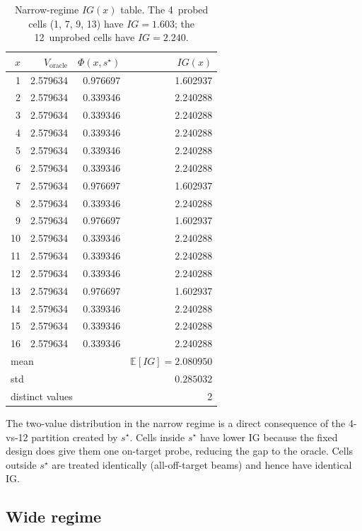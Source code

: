 \documentclass[11pt,a4paper]{article}
\newcommand{\E}{\mathbb{E}}
\begin{document}
\begin{table}[h!]
\centering
\begin{tabular}{@{}rrrr@{}}
\toprule
$x$ & $V_{\text{oracle}}$ & $\Phi(x, s^\star)$ & $IG(x)$ \\
\midrule
1     & 2.579634 & 0.976697 & 1.602937 \\
2     & 2.579634 & 0.339346 & 2.240288 \\
3     & 2.579634 & 0.339346 & 2.240288 \\
4     & 2.579634 & 0.339346 & 2.240288 \\
5     & 2.579634 & 0.339346 & 2.240288 \\
6     & 2.579634 & 0.339346 & 2.240288 \\
7     & 2.579634 & 0.976697 & 1.602937 \\
8     & 2.579634 & 0.339346 & 2.240288 \\
9     & 2.579634 & 0.976697 & 1.602937 \\
10    & 2.579634 & 0.339346 & 2.240288 \\
11    & 2.579634 & 0.339346 & 2.240288 \\
12    & 2.579634 & 0.339346 & 2.240288 \\
13    & 2.579634 & 0.976697 & 1.602937 \\
14    & 2.579634 & 0.339346 & 2.240288 \\
15    & 2.579634 & 0.339346 & 2.240288 \\
16    & 2.579634 & 0.339346 & 2.240288 \\
\midrule
\multicolumn{3}{l}{mean} & $\E[IG] = 2.080950$ \\
\multicolumn{3}{l}{std} & $0.285032$ \\
\multicolumn{3}{l}{distinct values} & 2 \\
\bottomrule
\end{tabular}
\caption{Narrow-regime $IG(x)$ table.  The 4~probed cells (1, 7, 9, 13) have $IG = 1.603$; the 12~unprobed cells have $IG = 2.240$.}
\label{tab:IG_narrow}
\end{table}

The two-value distribution in the narrow regime is a direct consequence of the 4-vs-12 partition created by $s^\star$.  Cells inside $s^\star$ have lower IG because the fixed design does give them one on-target probe, reducing the gap to the oracle.  Cells outside $s^\star$ are treated identically (all-off-target beams) and hence have identical IG.

\subsection{Wide regime}
\end{document}
